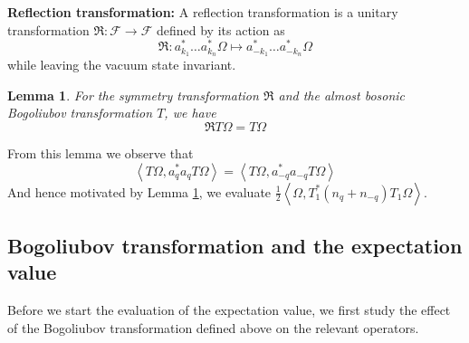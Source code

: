 \documentclass[sn-mathphys, Numbered ,a4paper]{sn-jnl}%
\newcommand{\half}{\frac{1}{2}}
\newcommand{\eva}[1]{\left\langle #1 \right\rangle}
\theoremstyle{plain}
\newtheorem{lemma}[theorem]{Lemma}
\theoremstyle{definition}
\theoremstyle{remark}
\theoremstyle{plain}
\theoremstyle{definition}
\theoremstyle{remark}
\begin{document}
\textbf{Reflection transformation:} A reflection transformation is a unitary transformation $\mathfrak{R}:\mathcal{F}\rightarrow \mathcal{F}$ defined by its action as
\begin{equation}
    \mathfrak{R}: a^*_{k_1}\ldots a^*_{k_n}\Omega \mapsto a^*_{-k_1}\ldots a^*_{-k_n}\Omega 
\end{equation}
while leaving the vacuum state invariant.\newline

\begin{lemma}\label{lem:symtransformation}
    For the symmetry transformation $\mathfrak{R}$ and the almost bosonic Bogoliubov transformation $T$, we have
    \begin{equation}
        \mathfrak{R}T\Omega = T\Omega
    \end{equation}
\end{lemma}
From this lemma we observe that 
\begin{equation}
    \eva{T\Omega, a^*_qa_qT\Omega} = \eva{T\Omega, a^*_{-q}a_{-q}T\Omega}
\end{equation}
And hence motivated by Lemma \ref{lem:symtransformation}, we evaluate $\half\eva{\Omega, T_1^*\left(n_q+n_{-q}\right)T_1\Omega}$.

\subsection{Bogoliubov transformation and the expectation value}
Before we start the evaluation of the expectation value, we first study the effect of the Bogoliubov transformation defined above on the relevant operators.
\end{document}
